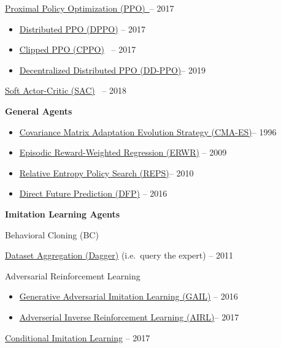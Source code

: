 \documentclass[
  a4paper,
  DIV=11,
  numbers=noendperiod]{scrreprt}
\providecommand{\tightlist}{%
  \setlength{\itemsep}{0pt}\setlength{\parskip}{0pt}}\usepackage{longtable,booktabs,array}
\begin{document}
\href{https://arxiv.org/abs/1707.06347}{Proximal Policy Optimization
(PPO)~}-- 2017

\begin{itemize}
\tightlist
\item
  \href{https://arxiv.org/abs/1707.02286}{Distributed PPO (DPPO)} --
  2017
\item
  \href{https://arxiv.org/pdf/1707.06347.pdf}{Clipped PPO (CPPO)}~ --
  2017
\item
  \href{https://arxiv.org/abs/1911.00357}{Decentralized Distributed PPO
  (DD-PPO)}-- 2019
\end{itemize}

\href{https://arxiv.org/abs/1801.01290}{Soft Actor-Critic (SAC)}~ --
2018

\textbf{General Agents}

\begin{itemize}
\tightlist
\item
  \href{https://ieeexplore.ieee.org/document/542381}{Covariance Matrix
  Adaptation Evolution Strategy (CMA-ES)}-- 1996
\item
  \href{https://papers.nips.cc/paper/3545-policy-search-for-motor-primitives-in-robotics.pdf}{Episodic
  Reward-Weighted Regression (ERWR)} -- 2009
\item
  \href{https://www.aaai.org/ocs/index.php/AAAI/AAAI10/paper/viewFile/1851/2264}{Relative
  Entropy Policy Search (REPS)}-- 2010
\item
  \href{https://arxiv.org/abs/1611.01779}{Direct Future Prediction
  (DFP)} -- 2016
\end{itemize}

\textbf{Imitation Learning Agents}

Behavioral Cloning (BC)

\href{https://www.cs.cmu.edu/~sross1/publications/Ross-AIStats11-NoRegret.pdf}{Dataset
Aggregation (Dagger)} (i.e.~query the expert) -- 2011

Adversarial Reinforcement Learning

\begin{itemize}
\tightlist
\item
  \href{https://arxiv.org/abs/1606.03476}{Generative Adversarial
  Imitation Learning (GAIL)} -- 2016
\item
  \href{https://arxiv.org/abs/1710.11248}{Adverserial Inverse
  Reinforcement Learning (AIRL)}-- 2017
\end{itemize}

\href{https://arxiv.org/abs/1710.02410}{Conditional Imitation Learning}
-- 2017
\end{document}
